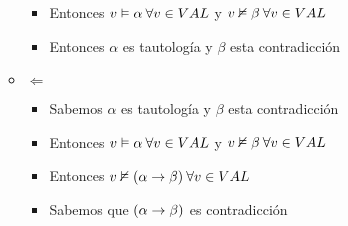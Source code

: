 \documentclass[14pt,a4paper,fleqn]{article}
\begin{document}
\begin{enumerate}
\begin{itemize}
\begin{itemize}
			\item Entonces $v \vDash \alpha \: \forall v \in VAL $ y $v \nvDash \beta \: \forall v \in VAL $
			\item Entonces $\alpha$ es tautología y $\beta$ esta contradicción
		\end{itemize}
		\item $\Leftarrow$
		\begin{itemize}
			\item Sabemos $\alpha$ es tautología y $\beta$ esta contradicción
			\item Entonces $v \vDash \alpha \: \forall v \in VAL $ y $v \nvDash \beta \: \forall v \in VAL $
			\item Entonces $v \nvDash (\alpha \rightarrow \beta) \: \forall v \in VAL $
			\item Sabemos que $(\alpha \rightarrow \beta)$ es contradicción
		\end{itemize}
	\end{itemize}
\end{enumerate}
\end{document}
